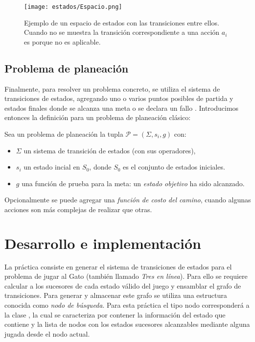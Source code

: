 \begin{figure}
  \centering
  \texttt{[image: estados/Espacio.png]}
  \caption{Ejemplo de un espacio de estados con las transiciones entre ellos. Cuando no se muestra la transición correspondiente a una acción $a_i$ es porque no es aplicable.}
  \label{fig:espacioestados}
\end{figure}


\subsection{Problema de planeación}


Finalmente, para resolver un problema concreto, se utiliza el sistema de transiciones de estados, agregando uno o varios puntos posibles de partida y estados finales donde se alcanza una meta o se declara un fallo  .  Introducimos entonces la definición para un problema de planeación clásico:


 \begin{definition}
  Sea un problema de planeación la tupla $\mathcal{P} = (\Sigma, s_i,g)$ con:

  \begin{itemize}
   \item $\Sigma$ un sistema de transición de estados (con sus operadores),
   \item $s_i$ un estado incial en $S_0$, donde $S_0$ es el conjunto de estados iniciales.
   \item $g$ una función de prueba para la meta: un \emph{estado objetivo} ha sido alcanzado.
  \end{itemize}
  \parencite{Ghallab2004}
 \end{definition}

 Opcionalmente se puede agregar una \emph{función de costo del camino}, cuando algunas acciones son más complejas de realizar que otras.



\section{Desarrollo e implementaci\'on}

La práctica consiste en generar el sistema de transiciones de estados para el problema de jugar al Gato (también llamado \textit{Tres en línea}).  Para ello se requiere calcular a los sucesores de cada estado válido del juego y ensamblar el grafo de transiciones.  Para generar y almacenar este grafo se utiliza una estructura conocida como \emph{nodo de búsqueda}.  Para esta práctica el tipo nodo corresponderá a la clase , la cual se caracteriza por contener la información del estado que contiene y la lista de nodos con los estados sucesores alcanzables mediante alguna jugada desde el nodo actual.

